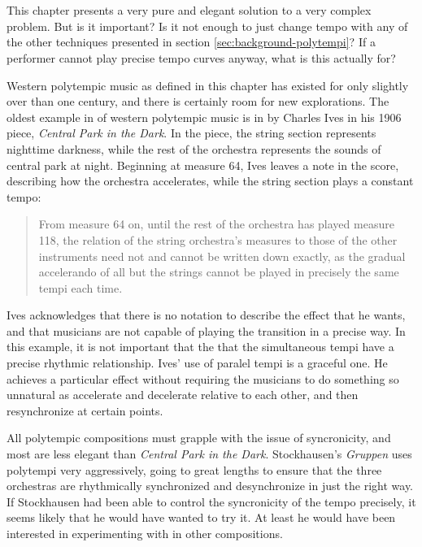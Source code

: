 \section{\polytempic}
This chapter presents a very pure and elegant solution to a very
complex problem. But is it important? Is it not enough to just change
tempo with any of the other techniques presented in section
\ref{sec:background-polytempi}? If a performer cannot play precise tempo
curves anyway, what is this actually for?

Western polytempic music as defined in this chapter has existed for
only slightly over than one century, and there is certainly room for
new explorations. The oldest example in of western polytempic music is
in by Charles Ives in his 1906 piece, \textit{Central Park in the
  Dark}.\cite{Greschak2003} In the piece, the string section
represents nighttime darkness, while the rest of the orchestra
represents the sounds of central park at night. Beginning at measure
64, Ives leaves a note in the score, describing how the orchestra
accelerates, while the string section plays a constant tempo:
\begin{quotation}
  From measure 64 on, until the rest of the orchestra has played
  measure 118, the relation of the string orchestra's measures to
  those of the other instruments need not and cannot be written down
  exactly, as the gradual accelerando of all but the strings cannot be
  played in precisely the same tempi each time.
\end{quotation}
Ives acknowledges that there is no notation to describe the effect
that he wants, and that musicians are not capable of playing the
transition in a precise way. In this example, it is not important that
the that the simultaneous tempi have a precise rhythmic
relationship. Ives' use of paralel tempi is a graceful one. He
achieves a particular effect without requiring the musicians to do
something so unnatural as accelerate and decelerate relative to each
other, and then resynchronize at certain points. 

All polytempic compositions must grapple with the issue of
syncronicity, and most are less elegant than \textit{Central Park in
  the Dark}. Stockhausen's \textit{Gruppen} uses polytempi very
aggressively, going to great lengths to ensure that the three
orchestras are rhythmically synchronized and desynchronize in just the
right way.  If Stockhausen had been able to control the syncronicity
of the tempo precisely, it seems likely that he would have wanted
to try it. At least he would have been interested in experimenting with
\polytempic in other compositions.

